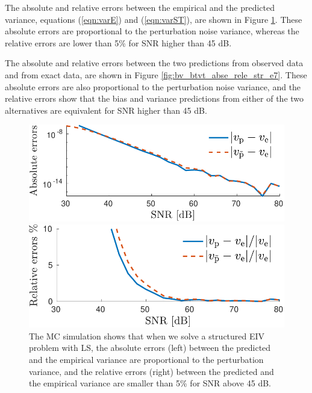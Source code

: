 The absolute and relative errors between the empirical and the predicted variance, equations (\ref{eqn:varE}) and (\ref{eqn:varST}), are shown in Figure \ref{fig:v_vt_abse_rele_str_e7}.
These absolute errors are proportional to the perturbation noise variance, whereas
the relative errors are lower than 5\% for SNR higher than 45 dB. 

The absolute and relative errors between the two predictions from observed data and from exact data, are shown in Figure \ref{fig:bv_btvt_abse_rele_str_e7}.
These absolute errors are also proportional to the perturbation noise variance, and
the relative errors show that the bias and variance predictions from either of the two alternatives are equivalent for SNR higher than 45 dB.

\begin{figure}[htb!]
    \centering
    \begin{minipage}{0.45\textwidth}
        \centering
        \includegraphics[width=1\textwidth]{./ChapterStatisticalAnalysis/fig/Fig_7l.pdf} 
    \end{minipage}
    \begin{minipage}{0.45\textwidth}
        \centering
        \includegraphics[width=1\textwidth]{./ChapterStatisticalAnalysis/fig/Fig_7r.pdf} 
    \end{minipage}
  \caption{ \label{fig:v_vt_abse_rele_str_e7} The MC simulation shows that when we solve a structured EIV problem with LS, the absolute errors (left) between the predicted and the empirical variance are proportional to the perturbation variance, and the relative errors (right) between the predicted and the empirical variance are smaller than 5\% for SNR above 45 dB. }
\end{figure}

